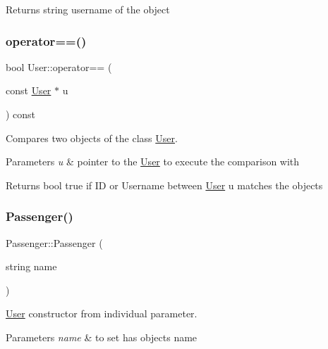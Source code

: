\begin{DoxyReturn}{Returns}
string username of the object 
\end{DoxyReturn}
\mbox{\label{group___user_gab403e4acde558a3f968aa13b74960da5}} 
\subsubsection{\texorpdfstring{operator==()}{operator==()}}
{\footnotesize\ttfamily bool User\+::operator== (\begin{DoxyParamCaption}\item[{const \hyperlink{class_user}{User} $\ast$}]{u }\end{DoxyParamCaption}) const}



Compares two objects of the class \hyperlink{class_user}{User}. 


\begin{DoxyParams}{Parameters}
{\em u} & pointer to the \hyperlink{class_user}{User} to execute the comparison with\\
\hline
\end{DoxyParams}
\begin{DoxyReturn}{Returns}
bool true if ID or Username between \hyperlink{class_user}{User} u matches the object\textquotesingle{}s 
\end{DoxyReturn}
\mbox{\label{group___user_ga00628e580d270e68278cc76994c841b1}} 
\subsubsection{\texorpdfstring{Passenger()}{Passenger()}\hspace{0.1cm}{\footnotesize\ttfamily [1/2]}}
{\footnotesize\ttfamily Passenger\+::\+Passenger (\begin{DoxyParamCaption}\item[{string}]{name }\end{DoxyParamCaption})}



\hyperlink{class_user}{User} constructor from individual parameter. 


\begin{DoxyParams}{Parameters}
{\em name} & to set has object\textquotesingle{}s name \\
\hline
\end{DoxyParams}
\mbox{\label{group___user_ga0c1aecc465a9e8887f2b9bd3e784438a}} 
